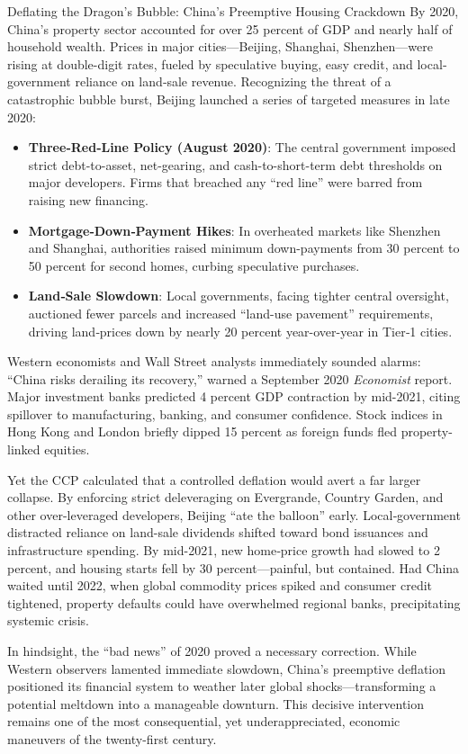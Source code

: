 \begin{HistoricalSidebar}{Deflating the Dragon’s Bubble: China’s Preemptive Housing Crackdown}
    By 2020, China’s property sector accounted for over 25 percent of GDP and nearly half of household wealth. Prices in major cities—Beijing, Shanghai, Shenzhen—were rising at double-digit rates, fueled by speculative buying, easy credit, and local‐government reliance on land‐sale revenue. Recognizing the threat of a catastrophic bubble burst, Beijing launched a series of targeted measures in late 2020:
    
    \begin{itemize}[nosep]
      \item \textbf{Three‐Red‐Line Policy (August 2020)}: The central government imposed strict debt-to-asset, net-gearing, and cash-to-short-term debt thresholds on major developers. Firms that breached any “red line” were barred from raising new financing.
      \item \textbf{Mortgage‐Down‐Payment Hikes}: In overheated markets like Shenzhen and Shanghai, authorities raised minimum down-payments from 30 percent to 50 percent for second homes, curbing speculative purchases.
      \item \textbf{Land‐Sale Slowdown}: Local governments, facing tighter central oversight, auctioned fewer parcels and increased “land-use pavement” requirements, driving land‐prices down by nearly 20 percent year-over-year in Tier‐1 cities.
    \end{itemize}
    
    Western economists and Wall Street analysts immediately sounded alarms: “China risks derailing its recovery,” warned a September 2020 \emph{Economist} report. Major investment banks predicted 4 percent GDP contraction by mid-2021, citing spillover to manufacturing, banking, and consumer confidence. Stock indices in Hong Kong and London briefly dipped 15 percent as foreign funds fled property-linked equities.
    
    Yet the CCP calculated that a controlled deflation would avert a far larger collapse. By enforcing strict deleveraging on Evergrande, Country Garden, and other over-leveraged developers, Beijing “ate the balloon” early. Local‐government distracted reliance on land-sale dividends shifted toward bond issuances and infrastructure spending. By mid-2021, new home‐price growth had slowed to 2 percent, and housing starts fell by 30 percent—painful, but contained. Had China waited until 2022, when global commodity prices spiked and consumer credit tightened, property defaults could have overwhelmed regional banks, precipitating systemic crisis.
    
    In hindsight, the “bad news” of 2020 proved a necessary correction. While Western observers lamented immediate slowdown, China’s preemptive deflation positioned its financial system to weather later global shocks—transforming a potential meltdown into a manageable downturn. This decisive intervention remains one of the most consequential, yet underappreciated, economic maneuvers of the twenty-first century.
\end{HistoricalSidebar}



